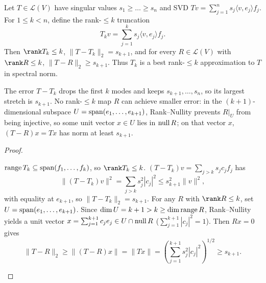 \documentclass[10pt]{scrartcl}
\newcommand{\LL}{\mathcal L}\newcommand{\PP}{\mathcal P}\newcommand{\MM}{\mathcal M}
\begin{document}
\begin{theorem*}
  Let $T\in\LL(V)$ have singular values $s_1\ge\dots\ge s_n$ and SVD $Tv=\sum_{j=1}^n s_j\langle v,e_j\rangle f_j$. For $1\le k<n$, define the rank-$\le k$ truncation
  \[
    T_k v = \sum_{j=1}^k s_j\langle v,e_j\rangle f_j.
  \]
  Then $\rank T_k\le k$, $\|T-T_k\|_2 = s_{k+1}$, and for every $R\in\LL(V)$ with $\rank R\le k$, $\|T-R\|_2 \ge s_{k+1}$. Thus $T_k$ is a best rank-$\le k$ approximation to $T$ in spectral norm.
\end{theorem*}
\begin{ideabox}
  The error $T-T_k$ drops the first $k$ modes and keeps $s_{k+1},\dots,s_n$, so its largest stretch is $s_{k+1}$. No rank-$\le k$ map $R$ can achieve smaller error: in the $(k+1)$-dimensional subspace $U=\operatorname{span}(e_1,\dots,e_{k+1})$, Rank--Nullity prevents $R|_U$ from being injective, so some unit vector $x\in U$ lies in $\operatorname{null} R$; on that vector $x$, $(T-R)x = Tx$ has norm at least $s_{k+1}$.
\end{ideabox}
\begin{proof}
  \begin{steps}
    \ii $\operatorname{range} T_k\subseteq\operatorname{span}(f_1,\dots,f_k)$, so $\rank T_k\le k$.
    \ii $(T-T_k)v = \sum_{j>k}s_j c_j f_j$ has
    \[ \|(T-T_k)v\|^2=\sum_{j>k}s_j^2|c_j|^2\le s_{k+1}^2\|v\|^2, \]
    with equality at $e_{k+1}$, so $\|T-T_k\|_2=s_{k+1}$.
    \ii For any $R$ with $\rank R\le k$, set $U=\operatorname{span}(e_1,\dots,e_{k+1})$. Since $\dim U=k+1 > k \ge \dim\operatorname{range} R$, Rank--Nullity  yields a unit vector $x=\sum_{j=1}^{k+1}c_je_j\in U\cap\operatorname{null} R$ ($\sum_{j=1}^{k+1}|c_j|^2=1$). Then $Rx=0$ gives
    \[
      \|T-R\|_2 \ge \|(T-R)x\| = \|Tx\| = \left(\sum_{j=1}^{k+1} s_j^2 |c_j|^2\right)^{1/2} \ge s_{k+1}.
    \]
  \end{steps}
\end{proof}
\end{document}
